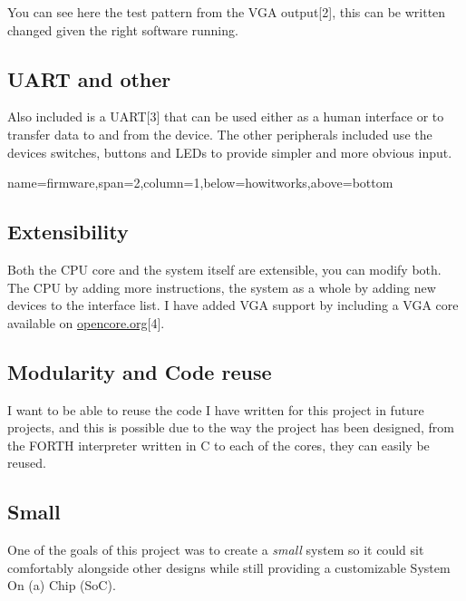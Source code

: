 \documentclass[a1paper,portrait]{baposter}
\begin{document}
\begin{poster}
{You can see here the test pattern from the VGA output[2], this can be written changed
given the right software running.

\subsection{UART and other}

Also included is a UART[3] that can be used either as a human interface or to transfer
data to and from the device. The other peripherals included use the devices switches,
buttons and LEDs to provide simpler and more obvious input.
}
{name=firmware,span=2,column=1,below=howitworks,above=bottom}{
\scriptsize
\subsection{Extensibility}
Both the CPU core and the system itself are extensible, you can modify both. The CPU by adding
more instructions, the system as a whole by adding new devices to the interface list. I have
added VGA support by including a VGA core available on \url{opencore.org}[4].
\subsection{Modularity and Code reuse}
I want to be able to reuse the code I have written for this project in future projects, and
this is possible due to the way the project has been designed, from the FORTH interpreter
written in C to each of the cores, they can easily be reused.
\subsection{Small}
One of the goals of this project was to create a \emph{small} system so it could sit
comfortably alongside other designs while still providing a customizable System On (a)
Chip (SoC).
}

\end{poster}
\end{document}
